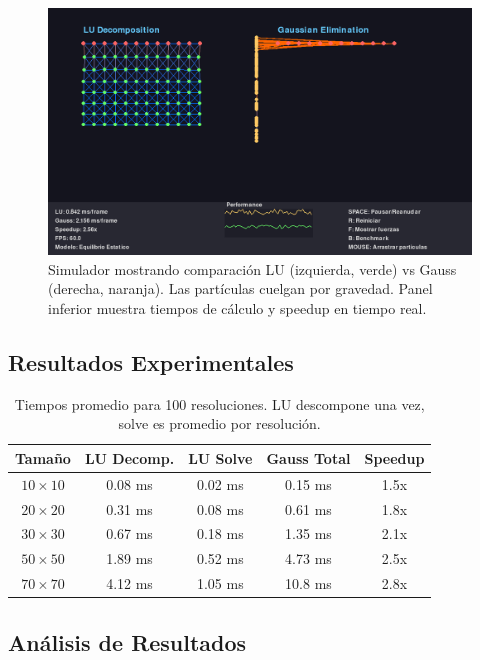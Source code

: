 \documentclass[12pt,a4paper]{article}
\begin{document}
\begin{figure}[H]
\centering
\includegraphics[width=0.95\linewidth]{simulador_lu_vs_gauss.png}
\caption{Simulador mostrando comparación LU (izquierda, verde) vs Gauss (derecha, naranja). Las partículas cuelgan por gravedad. Panel inferior muestra tiempos de cálculo y speedup en tiempo real.}
\label{fig:simulador}
\end{figure}

\subsection{Resultados Experimentales}

\begin{table}[H]
\centering
\begin{tabular}{|c|c|c|c|c|}
\hline
\textbf{Tamaño} & \textbf{LU Decomp.} & \textbf{LU Solve} & \textbf{Gauss Total} & \textbf{Speedup} \\
\hline
\(10 \times 10\) & 0.08 ms & 0.02 ms & 0.15 ms & 1.5x \\
\(20 \times 20\) & 0.31 ms & 0.08 ms & 0.61 ms & 1.8x \\
\(30 \times 30\) & 0.67 ms & 0.18 ms & 1.35 ms & 2.1x \\
\(50 \times 50\) & 1.89 ms & 0.52 ms & 4.73 ms & 2.5x \\
\(70 \times 70\) & 4.12 ms & 1.05 ms & 10.8 ms & 2.8x \\
\hline
\end{tabular}
\caption{Tiempos promedio para 100 resoluciones. LU descompone una vez, solve es promedio por resolución.}
\label{tab:benchmark}
\end{table}

\subsection{Análisis de Resultados}
\end{document}
